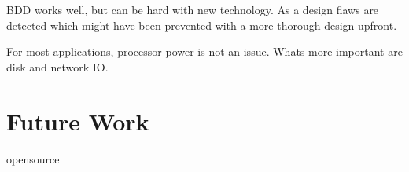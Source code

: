 
BDD works well, but can be hard with new technology. As a design flaws are
detected which might have been prevented with a more thorough design upfront.

For most applications, processor power is not an issue. Whats more important
are disk and network IO.

\section{Future Work}

opensource



